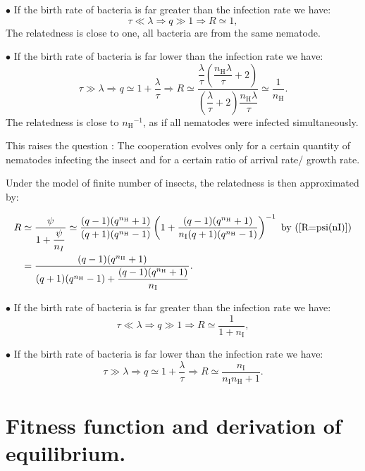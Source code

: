 \documentclass{article}
\newcommand{\nN}{{n_\textrm{H}}}
\newcommand{\nI}{{n_\textrm{I}}}
\begin{document}
 $\bullet$ If the birth rate of bacteria is far greater than the infection rate we have:
 \begin{equation}
 \tau \ll \lambda \Rightarrow q \gg 1 \Rightarrow R \simeq 1,
 \end{equation}
 The relatedness is close to one, all bacteria are from the same nematode.
 
 
 $\bullet$ If the birth rate of bacteria is far lower than the infection rate we have:
 \begin{equation}
 \tau \gg \lambda \Rightarrow q \simeq 1 + \frac{\lambda }{\tau } \Rightarrow R \simeq 
  \dfrac{\dfrac{\lambda}{\tau}\left( \dfrac{\nN\lambda}{\tau} +2\right)}{\left( \dfrac{\lambda}{\tau} +2\right)\dfrac{\nN\lambda}{\tau}} \simeq \dfrac{1}{\nN}.
 \end{equation}
  The relatedness is close to $\nN^{-1}$, as if all nematodes were infected simultaneously.
  
  This raises the question : The cooperation evolves only for a certain quantity of nematodes infecting the insect and for a certain ratio of arrival rate/ growth rate.

Under the model of finite number of insects, the relatedness is then approximated by: 
 
 \begin{align}
  R & \simeq \dfrac{\psi}{1+ \dfrac{\psi}{n_{I}}} \simeq \dfrac{(q-1)(q^\nN +1)}{(q+1)(q^\nN -1)} \left( 1+ \dfrac{(q-1)(q^\nN +1)}{\nI (q+1)(q^\nN -1)} \right)^{-1} \text{ by }(\ref{R=psi(nI)})\\
    &= \dfrac{(q-1)(q^\nN+1)}{ (q+1)(q^\nN -1)+ \dfrac{(q-1)(q^\nN +1)}{\nI}}.
 \end{align}
 
 
 $\bullet$ If the birth rate of bacteria is far greater than the infection rate we have:
 \begin{equation}
 \tau \ll \lambda \Rightarrow q \gg 1 \Rightarrow R \simeq \dfrac{1}{1+\nI},
 \end{equation}
 
 $\bullet$ If the birth rate of bacteria is far lower than the infection rate we have:
 \begin{equation}
 \tau \gg \lambda \Rightarrow q \simeq 1 + \frac{\lambda }{\tau } \Rightarrow R \simeq \dfrac{\nI}{\nI \nN +1}.
 \end{equation}



\section{Fitness function and derivation of equilibrium.}
 
\end{document}
